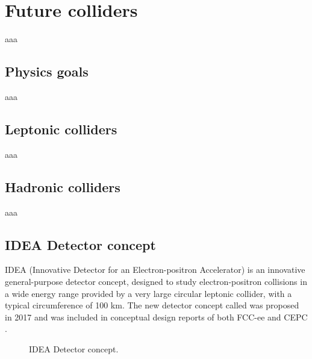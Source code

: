 \chapter{Future colliders}
aaa

\section{Physics goals}
aaa

\section{Leptonic colliders}
aaa

\section{Hadronic colliders}
aaa

\section{IDEA Detector concept} \label{chap:Idea_project}
IDEA (Innovative Detector for an Electron-positron Accelerator) is an innovative general-purpose detector concept, designed to study electron-positron collisions in a wide energy range provided by a very large circular leptonic collider, with a typical circumference of 100 km.
The new detector concept called was proposed in 2017 and was included in conceptual design reports of both FCC-ee \cite{FCC-ee_design} and CEPC \cite{CEPC_design}.

\begin{figure}
	\centering
	 \quad
	\caption{IDEA Detector concept.}
\end{figure}

